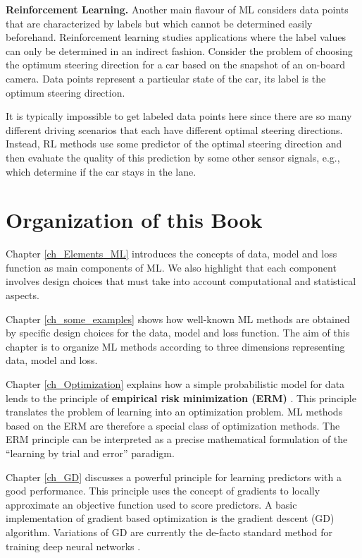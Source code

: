 \documentclass[12pt]{report}
\begin{document}
{\bf Reinforcement Learning.} 
Another main flavour of ML considers data points that are characterized 
by labels but which cannot be determined easily beforehand. Reinforcement 
learning studies applications where the label values can only be determined 
in an indirect fashion. Consider the problem of choosing the optimum 
steering direction for a car based on the snapshot of an on-board 
camera. Data points represent a particular state of the car, its label 
is the optimum steering direction. 

It is typically impossible to get labeled 
data points here since there are so many different driving scenarios that 
each have different optimal steering directions. Instead, RL methods use 
some predictor of the optimal steering direction and then evaluate the 
quality of this prediction by some other sensor signals, e.g., which determine 
if the car stays in the lane. 

\section{Organization of this Book}

Chapter \ref{ch_Elements_ML} introduces the concepts of data, 
model and loss function as main components of ML. We also 
highlight that each component involves design choices that must 
take into account computational and statistical aspects. 

Chapter \ref{ch_some_examples} shows how well-known ML methods 
are obtained by specific design choices for the data, model
and loss function. The aim of this chapter is to organize ML methods 
according to three dimensions representing data, model and loss. 

Chapter \ref{ch_Optimization} explains how a simple probabilistic 
model for data lends to the principle of {\bf empirical risk minimization (ERM)} . 
This principle translates the problem of learning into an optimization problem. 
ML methods based on the ERM are therefore a special class of 
optimization methods. The ERM principle can be interpreted as 
a precise mathematical formulation of the ``learning by trial and error'' paradigm. 

Chapter \ref{ch_GD} discusses a powerful principle for learning 
predictors with a good performance. This principle uses the concept 
of gradients to locally approximate an objective function used 
to score predictors. A basic implementation of gradient based 
optimization is the gradient descent (GD) algorithm. Variations 
of GD are currently the de-facto standard method for training 
deep neural networks \cite{Goodfellow-et-al-2016}. 
\end{document}

